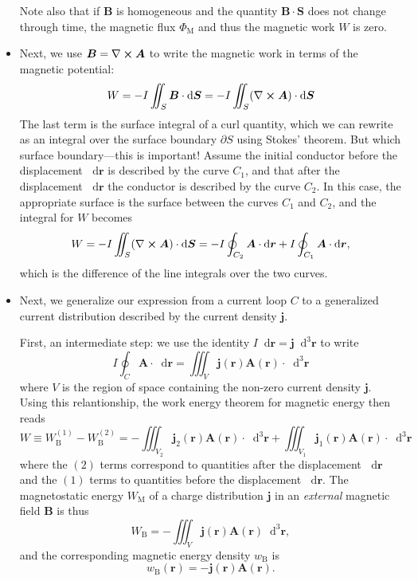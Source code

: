 \documentclass[11pt, a4paper]{article}
\newcommand{\diff}{\mathop{}\!\mathrm{d}} %
\newcommand{\dr}{\diff^{3} \r}  %
\renewcommand{\vec}[1]{\bm{#1}} %
\renewcommand{\r}{\vec{r}}
\newcommand{\B}{\vec{B}} %
\newcommand{\A}{\vec{A}} %
\renewcommand{\j}{\vec{j}}  %
\renewcommand{\curl}{\nabla \cross}
\begin{document}
\begin{itemize}
	Note also that if $ \B $ is homogeneous and the quantity $ \B \cdot \vec{S} $ does not change through time, the magnetic flux $ \Phi_{\text{M}} $ and thus the magnetic work $ W $ is zero.
	
    \item Next, we use $ \B = \curl \A $ to write the magnetic work in terms of the magnetic potential:
	\begin{equation*}
		W = - I \iint_{S}\B \cdot \diff \vec{S} = - I \iint_{S} (\curl \A) \cdot \diff \vec{S}
	\end{equation*}
	The last term is the surface integral of a curl quantity, which we can rewrite as an integral over the surface boundary $ \partial S $ using Stokes' theorem. But which surface boundary---this is important! Assume the initial conductor before the displacement $ \diff \r $ is described by the curve $ C_{1} $, and that after the displacement $ \diff \r $ the conductor is described by the curve $ C_{2} $. In this case, the appropriate surface is the surface between the curves $ C_{1} $ and $ C_{2} $, and the integral for $ W $ becomes
	\begin{equation*}
        W = - I \iint_{S} (\curl \A) \cdot \diff \vec{S} = - I \oint_{C_{2}} \A \cdot \diff \r  + I \oint_{C_{1}} \A \cdot \diff \r,
	\end{equation*}
	which is the difference of the line integrals over the two curves.
	
	\item Next, we generalize our expression from a current loop $ C $ to a generalized current distribution described by the current density $ \j $. 

    First, an intermediate step: we use the identity $ I \diff \r = \j \dr $ to write
	\begin{equation*}
		I \oint_{C} \A \cdot \diff \r = \iiint_{V} \j(\r)\A(\r) \cdot \dr
	\end{equation*}
	where $ V $ is the region of space containing the non-zero current density $ \j $. Using this relantionship, the work energy theorem for magnetic energy then reads
	\begin{equation*}
		W \equiv W_{\mathrm{B}}^{(1)} - W_{\mathrm{B}}^{(2)} = - \iiint_{V_{2}} \j_{2}(\r) \A(\r) \cdot \dr + \iiint_{V_{1}} \j_{1}(\r) \A(\r) \cdot \dr
	\end{equation*}
    where the $ (2) $ terms correspond to quantities after the displacement $ \diff \r $ and the $ (1) $ terms to quantities before the displacement $ \diff \r $. The magnetostatic energy $ W_{\text{M}} $ of a charge distribution $ \j $ in an \textit{external} magnetic field $ \B $ is thus
	\begin{equation*}
		W_{\mathrm{B}} = - \iiint_{V}\j(\r) \A(\r) \dr,
	\end{equation*}
	and the corresponding magnetic energy density $ w_{\mathrm{B}} $ is
	\begin{equation*}
		w_{\mathrm{B}}(\r) = - \j(\r) \A (\r).
	\end{equation*}
	
\end{itemize}
\end{document}
